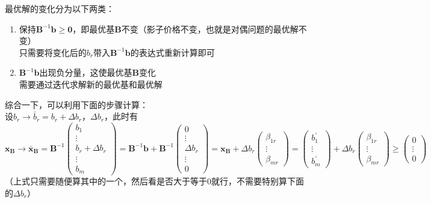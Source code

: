 \documentclass{book}
\begin{document}
最优解的变化分为以下两类：
\begin{enumerate}
    \item 保持$\boldsymbol{B}^{-1}\boldsymbol{b}\ge\boldsymbol{0}$，即最优基$\boldsymbol{B}$不变（影子价格不变，也就是对偶问题的最优解不变）\\
          只需要将变化后的$b_r$带入$\boldsymbol{B}^{-1}\boldsymbol{b}$的表达式重新计算即可
    \item $\boldsymbol{B}^{-1}\boldsymbol{b}$出现负分量，这使最优基$\boldsymbol{B}$变化\\
          需要通过迭代求解新的最优基和最优解
\end{enumerate}
综合一下，可以利用下面的步骤计算：\\
设$b_r\rightarrow\bar{b}_r=b_r+\Delta b_r$，$\Delta b_r$，此时有$$
    \boldsymbol{x_B}\rightarrow\boldsymbol{\bar{x}_B}=\boldsymbol{B}^{-1}\begin{pmatrix}
        b_1 \\ \vdots\\ b_r+\Delta b_r\\ \vdots\\ b_m
    \end{pmatrix}=\boldsymbol{B}^{-1}\boldsymbol{b}+\boldsymbol{B}^{-1}\begin{pmatrix}
        0 \\ \vdots\\ \Delta b_r\\ \vdots\\ 0
    \end{pmatrix}=\boldsymbol{x_B}+\Delta b_r\begin{pmatrix}
        \beta_{1r} \\ \vdots\\ \beta_{mr}
    \end{pmatrix}=\begin{pmatrix}
        b_1^{\prime} \\ \vdots\\ b_m^{\prime}
    \end{pmatrix}+\Delta b_r\begin{pmatrix}
        \beta_{1r} \\ \vdots\\ \beta_{mr}
    \end{pmatrix}\ge\begin{pmatrix}
        0 \\ \vdots\\ 0
    \end{pmatrix}
$$
（上式只需要随便算其中的一个，然后看是否大于等于0就行，不需要特别算下面的$\Delta b_r$）
\end{document}
